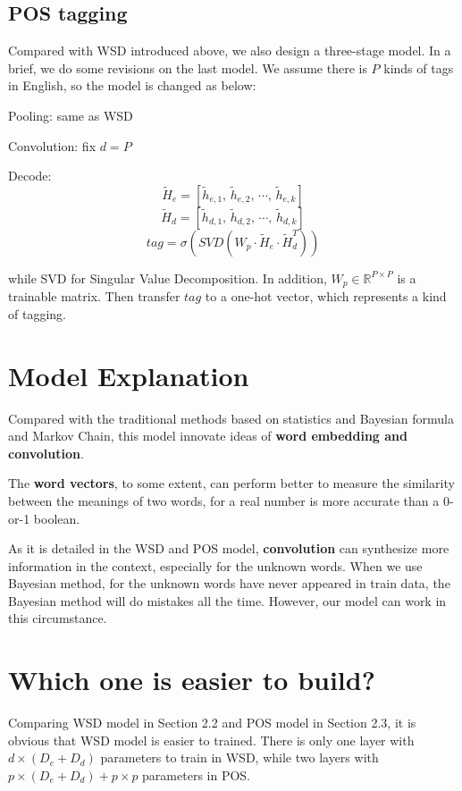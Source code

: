 \documentclass[11pt,a4paper]{article}
\begin{document}
\subsection{POS tagging}

Compared with WSD introduced above, we also design a three-stage model.
In a brief, we do some revisions on the last model. We assume there is $P$ kinds of 
tags in English, so the model is changed as below:

Pooling: same as WSD

Convolution: fix $d=P$

Decode:
$$\widetilde{H}_{e}=\left[\widetilde{h}_{e,1},\,\widetilde{h}_{e,2},\,\cdots,\,\widetilde{h}_{e,k}\right]$$
$$\widetilde{H}_{d}=\left[\widetilde{h}_{d,1},\,\widetilde{h}_{d,2},\,\cdots,\,\widetilde{h}_{d,k}\right]$$
$$tag=\sigma \left( SVD\left(W_{p}\cdot\widetilde{H}_{e}\cdot\widetilde{H}_{d}^{T}\right)\right)$$

while SVD for Singular Value Decomposition. In addition, $W_{p}\in \mathbb{R}^{P\times P}$ 
is a trainable matrix. Then transfer $tag$ to a one-hot vector, which 
represents a kind of tagging.

\section{Model Explanation}

Compared with the traditional methods based on statistics and Bayesian formula and Markov Chain, 
this model innovate ideas of \textbf{word embedding and convolution}.

The \textbf{word vectors}, to some extent, can perform better to measure the similarity between the 
meanings of two words, for a real number is more accurate than a 0-or-1 boolean.

As it is detailed in the WSD and POS model, \textbf{convolution} can synthesize more information 
in the context, especially for the unknown words. When we use Bayesian method, for the 
unknown words have never appeared in train data, the Bayesian method will do mistakes all 
the time. However, our model can work in this circumstance.

\section{Which one is easier to build?}

Comparing WSD model in Section 2.2 and POS model in Section 2.3, it is obvious that WSD model 
is easier to trained. There is only one layer with $d\times(D_{e}+D_{d})$ parameters 
to train in WSD, while two layers with $p\times(D_{e}+D_{d})+p\times p$ parameters in POS.
\end{document}
